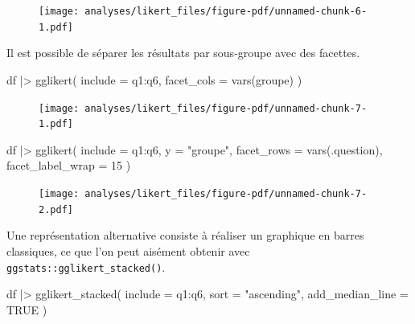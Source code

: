 \documentclass[
  letterpaper,
  DIV=11,
  numbers=noendperiod,
  oneside]{scrreprt}
\newenvironment{Shaded}{\begin{snugshade}}{\end{snugshade}}
\newcommand{\AttributeTok}[1]{\textcolor[rgb]{0.40,0.45,0.13}{#1}}
\newcommand{\ConstantTok}[1]{\textcolor[rgb]{0.56,0.35,0.01}{#1}}
\newcommand{\DecValTok}[1]{\textcolor[rgb]{0.68,0.00,0.00}{#1}}
\newcommand{\FunctionTok}[1]{\textcolor[rgb]{0.28,0.35,0.67}{#1}}
\newcommand{\NormalTok}[1]{\textcolor[rgb]{0.00,0.23,0.31}{#1}}
\newcommand{\SpecialCharTok}[1]{\textcolor[rgb]{0.37,0.37,0.37}{#1}}
\newcommand{\StringTok}[1]{\textcolor[rgb]{0.13,0.47,0.30}{#1}}
\begin{document}
\begin{figure}[H]

{\centering \texttt{[image: analyses/likert\_files/figure-pdf/unnamed-chunk-6-1.pdf]}

}

\end{figure}

Il est possible de séparer les résultats par sous-groupe avec des
facettes.

\begin{Shaded}
\begin{Highlighting}[]
\NormalTok{df }\SpecialCharTok{|\textgreater{}} 
  \FunctionTok{gglikert}\NormalTok{(}
    \AttributeTok{include =}\NormalTok{ q1}\SpecialCharTok{:}\NormalTok{q6,}
    \AttributeTok{facet\_cols =} \FunctionTok{vars}\NormalTok{(groupe)}
\NormalTok{  )}
\end{Highlighting}
\end{Shaded}

\begin{figure}[H]

{\centering \texttt{[image: analyses/likert\_files/figure-pdf/unnamed-chunk-7-1.pdf]}

}

\end{figure}

\begin{Shaded}
\begin{Highlighting}[]
\NormalTok{df }\SpecialCharTok{|\textgreater{}} 
  \FunctionTok{gglikert}\NormalTok{(}
    \AttributeTok{include =}\NormalTok{ q1}\SpecialCharTok{:}\NormalTok{q6,}
    \AttributeTok{y =} \StringTok{"groupe"}\NormalTok{,}
    \AttributeTok{facet\_rows =} \FunctionTok{vars}\NormalTok{(.question),}
    \AttributeTok{facet\_label\_wrap =} \DecValTok{15}
\NormalTok{  )}
\end{Highlighting}
\end{Shaded}

\begin{figure}[H]

{\centering \texttt{[image: analyses/likert\_files/figure-pdf/unnamed-chunk-7-2.pdf]}

}

\end{figure}

Une représentation alternative consiste à réaliser un graphique en
barres classiques, ce que l'on peut aisément obtenir avec
\texttt{ggstats::gglikert\_stacked()}.

\begin{Shaded}
\begin{Highlighting}[]
\NormalTok{df }\SpecialCharTok{|\textgreater{}}
  \FunctionTok{gglikert\_stacked}\NormalTok{(}
    \AttributeTok{include =}\NormalTok{ q1}\SpecialCharTok{:}\NormalTok{q6,}
    \AttributeTok{sort =} \StringTok{"ascending"}\NormalTok{,}
    \AttributeTok{add\_median\_line =} \ConstantTok{TRUE}
\NormalTok{  )}
\end{Highlighting}
\end{Shaded}
\end{document}
